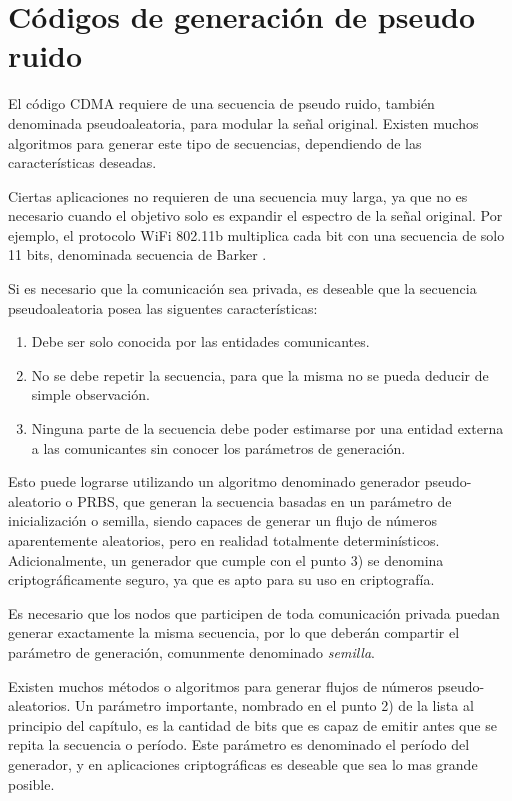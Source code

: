 \section{Códigos de generación de pseudo ruido}
\label{PRNGs} 
El código CDMA requiere de una secuencia de pseudo ruido, también denominada pseudoaleatoria, para modular la señal original. Existen muchos algoritmos para generar este tipo de secuencias, dependiendo de las características deseadas.

Ciertas aplicaciones no requieren de una secuencia muy larga, ya que no es necesario cuando el objetivo solo es expandir el espectro de la señal original. Por ejemplo, el protocolo WiFi 802.11b multiplica cada bit con una secuencia de solo 11 bits, denominada secuencia de Barker \cite{mikulka2007cck}.

Si es necesario que la comunicación sea privada, es deseable que la secuencia pseudoaleatoria posea las siguentes características:

\begin{enumerate}
 \item Debe ser solo conocida por las entidades comunicantes.
 \item No se debe repetir la secuencia, para que la misma no se pueda deducir de simple observación.
 \item Ninguna parte de la secuencia debe poder estimarse por una entidad externa a las comunicantes sin conocer los parámetros de generación.
\end{enumerate}

 Esto puede lograrse utilizando un algoritmo denominado generador pseudo-aleatorio o PRBS, que generan la secuencia basadas en un parámetro de inicialización o semilla, siendo capaces de generar un flujo de números aparentemente aleatorios, pero en realidad totalmente determinísticos. Adicionalmente, un generador que cumple con el punto 3) se denomina criptográficamente seguro, ya que es apto para su uso en criptografía.
 
Es necesario que los nodos que participen de toda comunicación privada puedan generar exactamente la misma secuencia, por lo que deberán compartir el parámetro de generación, comunmente denominado \textit{semilla}.

Existen muchos métodos o algoritmos para generar flujos de números pseudo-aleatorios. Un parámetro importante, nombrado en el punto 2) de la lista al principio del capítulo, es la cantidad de bits que es capaz de emitir antes que se repita la secuencia o período. Este parámetro es denominado el período del generador, y en aplicaciones criptográficas es deseable que sea lo mas grande posible. 

